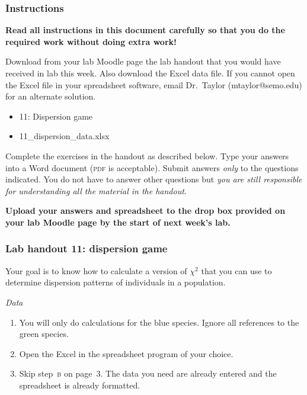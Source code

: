 \documentclass[12pt]{exam}
\begin{document}
\subsubsection*{Instructions}

\textbf{Read all instructions in this document carefully so that you do the required work without doing extra work!}

Download from your lab Moodle page the lab handout that you would have received in lab this week. Also download the Excel data file. If you cannot open the Excel file in your spreadsheet software, email Dr.~Taylor (mtaylor@semo.edu) for an alternate solution.

\begin{itemize}
\item 11: Dispersion game
\item 11\_dispersion\_data.xlsx
\end{itemize}

Complete the exercises in the handout as described below. Type your answers into a Word document (\textsc{pdf} is acceptable). Submit answers \emph{only} to the questions indicated. You do not have to answer other questions but \emph{you are still responsible for understanding all the material in the handout}.

\textbf{Upload your answers and spreadsheet to the drop box provided on your lab Moodle page by the start of next week's lab.}


\subsubsection*{Lab handout 11: dispersion game}

Your goal is to know how to calculate a version of $\chi^2$ that you can use to determine dispersion patterns of individuals in a population.


\emph{Data}

\begin{enumerate}
\item You will only do calculations for the blue species. Ignore all references to the green species.

\item Open the Excel in the spreadsheet program of your choice. 

\item Skip step~\textsc{b} on page~3. The data you need are already entered and the spreadsheet is already formatted. 

\end{enumerate}
\end{document}
